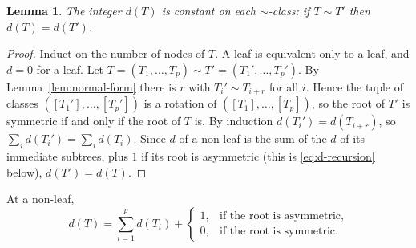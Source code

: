\documentclass[11pt]{amsart}
\newtheorem{lemma}[theorem]{Lemma}
\theoremstyle{definition}
\theoremstyle{remark}
\begin{document}
\begin{lemma}\label{lem:d-invariant}
The integer $d(T)$ is constant on each $\sim$-class: if $T\sim T'$ then $d(T)=d(T')$.
\end{lemma}
\begin{proof}
Induct on the number of nodes of $T$.  A leaf is equivalent only to a leaf, and $d=0$ for a leaf.  Let $T=(T_1,\ldots,T_p)\sim T'=(T_1',\ldots,T_p')$.  By Lemma~\ref{lem:normal-form} there is $r$ with $T_i'\sim T_{i+r}$ for all $i$.  Hence the tuple of classes $([T_1'],\ldots,[T_p'])$ is a rotation of $([T_1],\ldots,[T_p])$, so the root of $T'$ is symmetric if and only if the root of $T$ is.  By induction $d(T_i')=d(T_{i+r})$, so $\sum_id(T_i')=\sum_id(T_i)$.  Since $d$ of a non-leaf is the sum of the $d$ of its immediate subtrees, plus $1$ if its root is asymmetric (this is \eqref{eq:d-recursion} below), $d(T')=d(T)$.
\end{proof}
At a non-leaf,
\begin{equation}\label{eq:d-recursion}
 d(T)=\sum_{i=1}^pd(T_i)+
 \begin{cases}
 1,&\text{if the root is asymmetric},\\
 0,&\text{if the root is symmetric}.
 \end{cases}
\end{equation}
\end{document}
